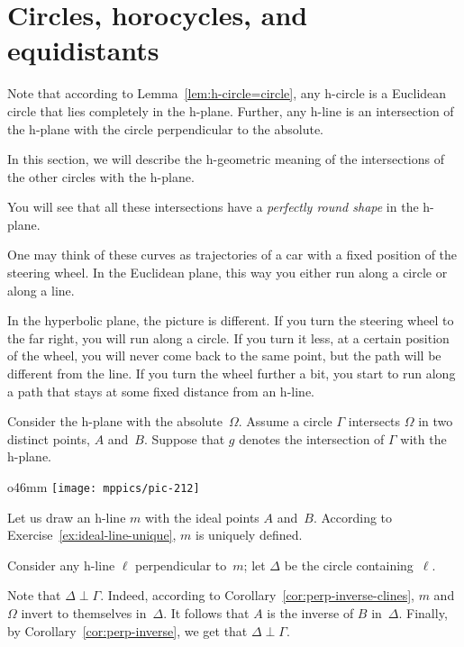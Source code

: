 \section*{Circles, horocycles, and equidistants}

Note that according to Lemma~\ref{lem:h-circle=circle},
any h-circle is a Euclidean circle that lies completely in the h-plane.
Further, any h-line is an intersection of the h-plane with the circle 
perpendicular to the absolute.

In this section, we will describe the 
h-geometric meaning of the intersections 
of the other circles with the h-plane.

You will see that all these intersections have a {}\emph{perfectly round shape} in the h-plane.

One may think of these curves as trajectories of a car with a fixed position of the steering wheel.
In the Euclidean plane, 
this way you either run along a circle or along a line.

In the hyperbolic plane, the picture is different.
If you turn the steering wheel to the far right, you will run along a circle.
If you turn it less, at a certain position of the wheel, you will never come back to the same point, but the path will be different from the line.
If you turn the wheel further a bit, you start to run along a path that stays at some fixed distance from an h-line.

Consider the h-plane with the absolute~$\Omega$.
Assume a circle $\Gamma$ intersects $\Omega$ in two distinct points, $A$ and~$B$. 
Suppose that $g$ denotes the intersection of $\Gamma$ with the h-plane.

\begin{wrapfigure}{o}{46mm}
\vskip-0mm
\centering
\texttt{[image: mppics/pic-212]}
\end{wrapfigure}

Let us draw an h-line $m$ with the ideal points $A$ and~$B$.
According to Exercise~\ref{ex:ideal-line-unique}, $m$ is uniquely defined.

Consider any h-line $\ell$ perpendicular to~$m$;
let $\Delta$ be the circle containing~$\ell$.

Note that $\Delta\perp \Gamma$.
Indeed,
according to Corollary~\ref{cor:perp-inverse-clines}, $m$ and $\Omega$ invert to themselves in~$\Delta$.
It follows that $A$ is the inverse of $B$ in~$\Delta$.
Finally, by Corollary~\ref{cor:perp-inverse}, we get that $\Delta\perp \Gamma$.

